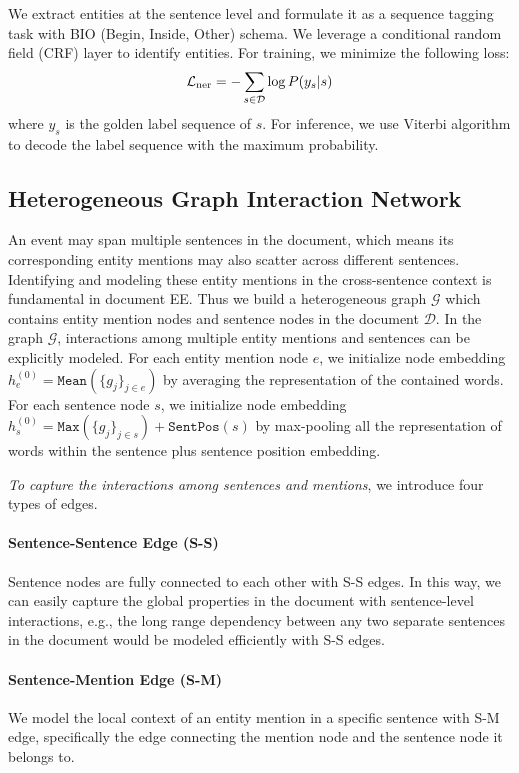 \documentclass[11pt,a4paper]{article}
\begin{document}
We extract entities at the sentence level and formulate it as a sequence tagging task with BIO (Begin, Inside, Other) schema.
We leverage a conditional random field (CRF) layer to identify entities.
For training, we minimize the following loss:
\begin{equation}
\setlength\abovedisplayskip{8pt}
\setlength\belowdisplayskip{8pt}
\mathcal{L}_{\mathrm{ner}} = -\sum_{s \in \mathcal{D}} \log P(y_s|s)
\label{loss:ner}
\end{equation}
where $y_s$ is the golden label sequence of $s$.
For inference, we use Viterbi algorithm to decode the label sequence with the maximum probability.

\subsection{Heterogeneous Graph Interaction Network}
\label{sec:git_structure}

An event may span multiple sentences in the document, which means its corresponding entity mentions may also scatter across different sentences. 
Identifying and modeling these entity mentions in the cross-sentence context is fundamental in document EE. 
Thus we build a heterogeneous graph $\mathcal{G}$ which contains entity mention nodes and sentence nodes in the document $\mathcal{D}$.
In the graph $\mathcal{G}$, 
interactions among multiple entity mentions and sentences can be explicitly modeled.
For each entity mention node $e$, 
we initialize node embedding $h_e^{(0)} = \texttt{Mean}(\{g_j\}_{j \in e}) $ by averaging the representation of the contained words.
For each sentence node $s$,
we initialize node embedding $h_s^{(0)} = \texttt{Max}(\{g_j\}_{j \in s}) + \texttt{SentPos}(s)$ by max-pooling all the representation of words within the sentence plus sentence position embedding.

\emph{To capture the interactions among sentences and mentions}, we introduce four types of edges.
    \paragraph{Sentence-Sentence Edge (S-S)} Sentence nodes are fully connected to each other with S-S edges. 
    In this way, we can easily capture the global properties in the document with sentence-level interactions, e.g., the long range dependency between any two separate sentences in the document would be modeled efficiently with S-S edges.
    \paragraph{Sentence-Mention Edge (S-M)} We model the local context of an entity mention in a specific sentence with S-M edge, specifically the edge connecting the mention node and the sentence node it belongs to.
\end{document}
